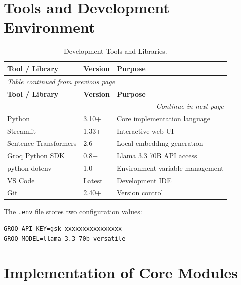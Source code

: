 \section{Tools and Development Environment}

\setlength{\LTleft}{\fill}
\setlength{\LTright}{\fill}

\renewcommand{\arraystretch}{1.05}

\begin{longtable}{|p{3.3cm}|p{2.4cm}|p{5.8cm}|}
\caption{Development Tools and Libraries.}
\label{tab:tools} \\
\hline
\rowcolor{gray!15}
\textbf{Tool / Library} & \textbf{Version} & \textbf{Purpose} \\
\hline
\endfirsthead

\multicolumn{3}{l}{\small\textit{Table \thetable{} continued from previous page}} \\[2pt]
\hline
\rowcolor{gray!15}
\textbf{Tool / Library} & \textbf{Version} & \textbf{Purpose} \\
\hline
\endhead

\hline
\multicolumn{3}{r}{\small\textit{Continue in next page}} \\
\endfoot

\hline
\endlastfoot

Python       & 3.10+ & Core implementation language \\
\hline
Streamlit    & 1.33+ & Interactive web UI \\
\hline
Sentence-Transformers & 2.6+ & Local embedding generation \\
\hline
Groq Python SDK & 0.8+ & Llama 3.3 70B API access \\
\hline
python-dotenv & 1.0+ & Environment variable management \\
\hline
VS Code      & Latest & Development IDE \\
\hline
Git          & 2.40+ & Version control \\
\hline

\end{longtable}

The \texttt{.env} file stores two configuration values:
\begin{verbatim}
GROQ_API_KEY=gsk_xxxxxxxxxxxxxxxx
GROQ_MODEL=llama-3.3-70b-versatile
\end{verbatim}

\section{Implementation of Core Modules}

